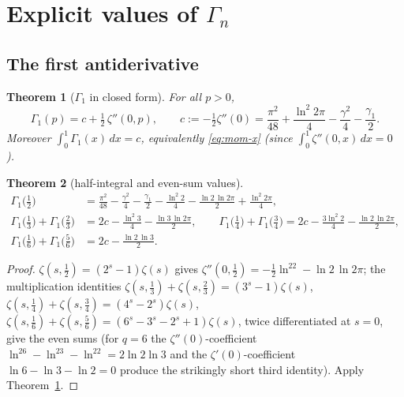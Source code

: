 \documentclass[11pt]{article}
\newtheorem{theorem}{Theorem}[section]
\theoremstyle{remark}
\newcommand{\lntwopi}{\ln 2\pi}
\begin{document}
\section{Explicit values of \texorpdfstring{$\Gamma_{\!n}$}{Gamma\_n}}
\label{sec:values}

\subsection{The first antiderivative}

\begin{theorem}[$\Gamma_{\!1}$ in closed form]\label{thm:G1law}
For all $p>0$,
\[
\Gamma_{\!1}(p)=c+\tfrac12\,\zeta''(0,p),
\qquad
c:=-\tfrac12\zeta''(0)
=\frac{\pi^2}{48}+\frac{\ln^2 2\pi}{4}-\frac{\gamma^2}{4}-\frac{\gamma_1}{2}.
\]
Moreover $\int_0^1\Gamma_{\!1}(x)\,dx=c$, equivalently
\eqref{eq:mom-x} (since $\int_0^1\zeta''(0,x)\,dx=0$
\cite{Deninger,Coffey}).
\end{theorem}

\begin{theorem}[half-integral and even-sum values]\label{thm:G1half}
\begin{align*}
\Gamma_{\!1}\bigl(\tfrac12\bigr)
&=\frac{\pi^2}{48}-\frac{\gamma^2}{4}-\frac{\gamma_1}{2}
-\frac{\ln^2 2}{4}-\frac{\ln 2\,\ln 2\pi}{2}+\frac{\ln^2 2\pi}{4},\\
\Gamma_{\!1}\bigl(\tfrac13\bigr)+\Gamma_{\!1}\bigl(\tfrac23\bigr)
&=2c-\frac{\ln^2 3}{4}-\frac{\ln 3\,\ln 2\pi}{2},\qquad
\Gamma_{\!1}\bigl(\tfrac14\bigr)+\Gamma_{\!1}\bigl(\tfrac34\bigr)
=2c-\frac{3\ln^2 2}{4}-\frac{\ln 2\,\ln 2\pi}{2},\\
\Gamma_{\!1}\bigl(\tfrac16\bigr)+\Gamma_{\!1}\bigl(\tfrac56\bigr)
&=2c-\frac{\ln 2\,\ln 3}{2}.
\end{align*}
\end{theorem}

\begin{proof}
$\zeta(s,\tfrac12)=(2^s-1)\zeta(s)$ gives
$\zeta''(0,\tfrac12)=-\tfrac12\ln^22-\ln2\,\lntwopi$; the multiplication
identities $\zeta(s,\tfrac13)+\zeta(s,\tfrac23)=(3^s-1)\zeta(s)$,
$\zeta(s,\tfrac14)+\zeta(s,\tfrac34)=(4^s-2^s)\zeta(s)$,
$\zeta(s,\tfrac16)+\zeta(s,\tfrac56)=(6^s-3^s-2^s+1)\zeta(s)$, twice
differentiated at $s=0$, give the even sums (for $q=6$ the
$\zeta''(0)$-coefficient $\ln^26-\ln^23-\ln^22=2\ln2\ln3$ and the
$\zeta'(0)$-coefficient $\ln6-\ln3-\ln2=0$ produce the strikingly short
third identity). Apply Theorem~\ref{thm:G1law}.
\end{proof}
\end{document}

